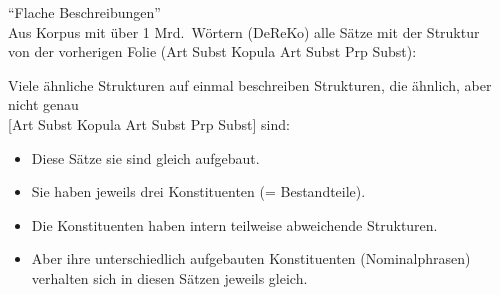 \begin{frame}
  {"`Flache Beschreibungen"'}
  \pause
  \\
  \Zeile
  \pause
  Aus Korpus mit \alert{über 1 Mrd.\ Wörtern} (DeReKo) \alert{alle Sätze} mit der Struktur\\
  von der vorherigen Folie (Art Subst Kopula Art Subst Prp Subst):\\
  \pause
  \Zeile
  \begin{exe}
    \ex
    \begin{xlist}
      \pause
      \pause
      \pause
    \end{xlist}
  \end{exe}
\end{frame}

\begin{frame}
  {Viele ähnliche Strukturen auf einmal beschreiben}
  \pause
  Strukturen, die ähnlich, aber \alert{nicht genau} \\
  \alert{[Art Subst Kopula Art Subst Prp Subst]} sind:\\
  \pause
  \Zeile
  \begin{exe}
    \ex\label{ex:syntaktischestruktur013}
    \begin{xlist}
      \pause
      \pause
      \pause
    \end{xlist}
  \end{exe}
  \pause
  \Halbzeile
  \begin{itemize}[<+->]
    \item Diese Sätze sie sind \alert{gleich aufgebaut}.
    \item Sie haben jeweils \alert{drei Konstituenten} (= Bestandteile).
    \item Die Konstituenten haben intern teilweise abweichende Strukturen.
    \item Aber ihre unterschiedlich aufgebauten Konstituenten (Nominalphrasen)\\
      verhalten sich in diesen Sätzen jeweils gleich. 
  \end{itemize}
\end{frame}


